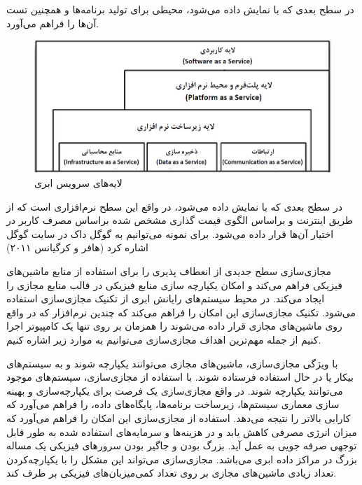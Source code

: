  در سطح بعدی که با 
  نمایش داده می‌شود، محیطی برای تولید برنامه‌ها و همچنین تست آن‌ها  را فراهم می‌آورد. 
            \begin{figure}
	\includegraphics[width=1\textwidth]{files/layers.jpg}
	\caption{لایه‌های سرویس ابری}
\end{figure}
  
 در سطح بعدی که با 
 نمایش داده می‌شود، در واقع این سطح نرم‌افزاری است که از طریق اینترنت و براساس الگوی قیمت گذاری مشخص شده براساس مصرف کاربر در اختیار آن‌ها قرار داده می‌شود. برای نمونه می‌توانیم به گوگل داک در سایت گوگل اشاره کرد
 (هافر و کرگیانس
  ۲۰۱۱)


مجازی‌سازی سطح جدیدی از انعطاف پذیری را برای استفاده از منابع ماشین‌های فیزیکی
 فراهم می‌کند و امکان یکپارچه سازی منابع فیزیکی   در قالب منابع مجازی  را ایجاد می‌کند. در محیط سیستم‌های رایانش ابری از تکنیک مجازی‌سازی استفاده می‌شود. تکنیک مجازی‌سازی این امکان را فراهم می‌کند که چندین نرم‌افزار که در واقع روی ماشین‌های مجازی
 قرار داده می‌شوند را همزمان بر روی تنها یک کامپیوتر اجرا کنیم از جمله مهم‌ترین اهداف مجازی‌سازی می‌توانیم به موارد زیر اشاره کنیم.

با ویژگی مجازی‌سازی، ماشین‌های مجازی می‌توانند یکپارچه شوند و به سیستم‌های بیکار یا در حال استفاده فرستاده شوند. با استفاده از مجازی‌سازی، سیستم‌های موجود می‌توانند یکپارچه شوند. در واقع مجازی‌سازی یک فرصت برای یکپارچه‌سازی و بهینه سازی معماری سیستم‌ها، زیرساخت برنامه‌ها، پایگاه‌های داده، را فراهم می‌آورد که کارایی بالاتر را نتیجه می‌دهد.
 استفاده از مجازی‌سازی این امکان را فراهم می‌آورد که میزان انرژی مصرفی کاهش یابد و در هزینه‌ها و سرمایه‌های استفاده شده به طور قابل توجهی صرفه جویی به عمل آید.
  بزرگ بودن و جاگیر بودن سرورهای فیزیکی یک مساله بزرگ در مراکز داده ابری می‌باشد. مجازی‌سازی می‌تواند این مشکل را با یکپارچه‌کردن تعداد زیادی ماشین‌های مجازی بر روی تعداد کمی‌میزبان‌های فیزیکی بر طرف کند.
  
